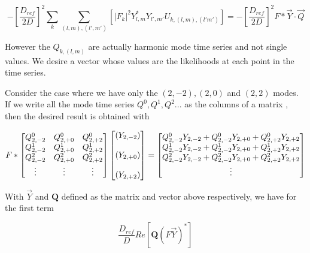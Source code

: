 \documentclass[paper=a4, fontsize=11pt]{scrartcl} %
\numberwithin{equation}{section} %
\numberwithin{figure}{section} %
\numberwithin{table}{section} %
\begin{document}
\begin{equation}
- \left[\frac{D_{ref}}{2D}\right]^{2}\sum_{k}\sum_{(l,m),(l',m')}\left[|F_k|^2 Y_{l,m}^{*}Y_{l',m'}U_{k,(l,m),(l'm')}\right] = - \left[\frac{D_{ref}}{2D}\right]^{2} F*\vec{Y}\cdot\vec{Q}
\end{equation}

However the $Q_{k,(l,m)}$ are actually harmonic mode time series and not single values. We desire a vector whose values are the likelihoods at each point in the time series. 

Consider the case where we have only the $(2,-2), (2,0)$ and $(2,2)$ modes. If we write all the mode time series $Q^0, Q^1, Q^2...$ as the columns of a matrix , then the desired result is obtained with

\begin{align}
F*
\begin{bmatrix}
Q^0_{2,-2} & Q^0_{2,+0} & Q^0_{2,+2} \\
Q^1_{2,-2} & Q^1_{2,+0} & Q^1_{2,+2} \\ 
Q^2_{2,-2} & Q^2_{2,+0} & Q^2_{2,+2} \\
\vdots & \vdots & \vdots
\end{bmatrix}
\begin{bmatrix}
\left(Y_{2,-2}\right)\\
\hspace{0mm} \\
\left(Y_{2,+0}\right) \\
\hspace{0mm} \\
\left(Y_{2,+2}\right) \\
\end{bmatrix}
=
\begin{bmatrix}
Q^0_{2,-2} Y_{2,-2} + Q^0_{2,-2}Y_{2,+0} + Q^0_{2,+2}Y_{2,+2} \\
Q^1_{2,-2} Y_{2,-2} + Q^1_{2,-2}Y_{2,+0} + Q^1_{2,+2}Y_{2,+2} \\
Q^2_{2,-2} Y_{2,-2} + Q^2_{2,-2}Y_{2,+0} + Q^2_{2,+2}Y_{2,+2} \\
\vdots
\end{bmatrix}
\end{align}

With $\vec{Y}$ and $\mathbf{Q}$ defined as the matrix and vector above respectively, we have for the first term

\begin{equation}
\frac{D_{ref}}{D}Re\left[\mathbf{Q}\left(F\vec{Y}\right)^{*}\right]
\end{equation}
\end{document}
